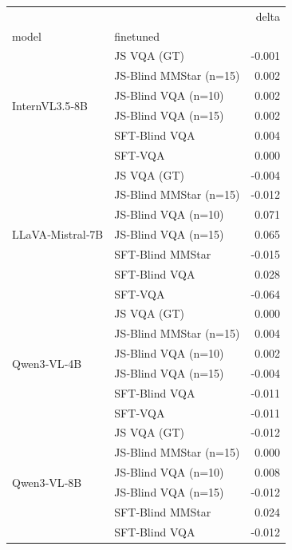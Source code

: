 \begin{tabular}{llr}
\toprule
 &  & delta \\
model & finetuned &  \\
\midrule
\multirow[t]{6}{*}{InternVL3.5‑8B} &  JS VQA (GT) & -0.001 \\
 &  JS‑Blind MMStar (n=15) & 0.002 \\
 &  JS‑Blind VQA (n=10) & 0.002 \\
 &  JS‑Blind VQA (n=15) & 0.002 \\
 &  SFT‑Blind VQA & 0.004 \\
 &  SFT‑VQA & 0.000 \\
\cline{1-3}
\multirow[t]{7}{*}{LLaVA‑Mistral‑7B} &  JS VQA (GT) & -0.004 \\
 &  JS‑Blind MMStar (n=15) & -0.012 \\
 &  JS‑Blind VQA (n=10) & 0.071 \\
 &  JS‑Blind VQA (n=15) & 0.065 \\
 &  SFT‑Blind MMStar & -0.015 \\
 &  SFT‑Blind VQA & 0.028 \\
 &  SFT‑VQA & -0.064 \\
\cline{1-3}
\multirow[t]{6}{*}{Qwen3‑VL‑4B} &  JS VQA (GT) & 0.000 \\
 &  JS‑Blind MMStar (n=15) & 0.004 \\
 &  JS‑Blind VQA (n=10) & 0.002 \\
 &  JS‑Blind VQA (n=15) & -0.004 \\
 &  SFT‑Blind VQA & -0.011 \\
 &  SFT‑VQA & -0.011 \\
\cline{1-3}
\multirow[t]{6}{*}{Qwen3‑VL‑8B} &  JS VQA (GT) & -0.012 \\
 &  JS‑Blind MMStar (n=15) & 0.000 \\
 &  JS‑Blind VQA (n=10) & 0.008 \\
 &  JS‑Blind VQA (n=15) & -0.012 \\
 &  SFT‑Blind MMStar & 0.024 \\
 &  SFT‑Blind VQA & -0.012 \\
\cline{1-3}
\bottomrule
\end{tabular}
